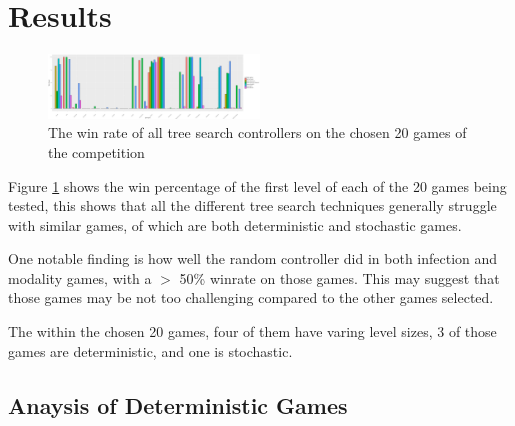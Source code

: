 \documentclass[journal]{IEEEtran}
\begin{document}

\section{Results}
		\begin{figure}[h]
		    \centering
		    \includegraphics[width=0.5\textwidth]{allGameBarPlot}
		    \caption{ The win rate of all tree search controllers on the chosen 20 games of the competition}
		    \label{fig:allGameBarPlot}
		\end{figure}



		Figure \ref{fig:allGameBarPlot} shows the win percentage of the first level of each of the 20 games being tested, this shows that all the different tree search techniques generally struggle with similar games, of which are both deterministic and stochastic games.


	One notable finding is how well the random controller did in both infection and modality games, with a $>$ 50\% winrate on those games. This may suggest that those games may be not too challenging compared to the other games selected.

	
	The within the chosen 20 games, four of them have varing level sizes, 3 of those games are deterministic, and one is stochastic.
	 \subsection{Anaysis of Deterministic Games}

\end{document}
